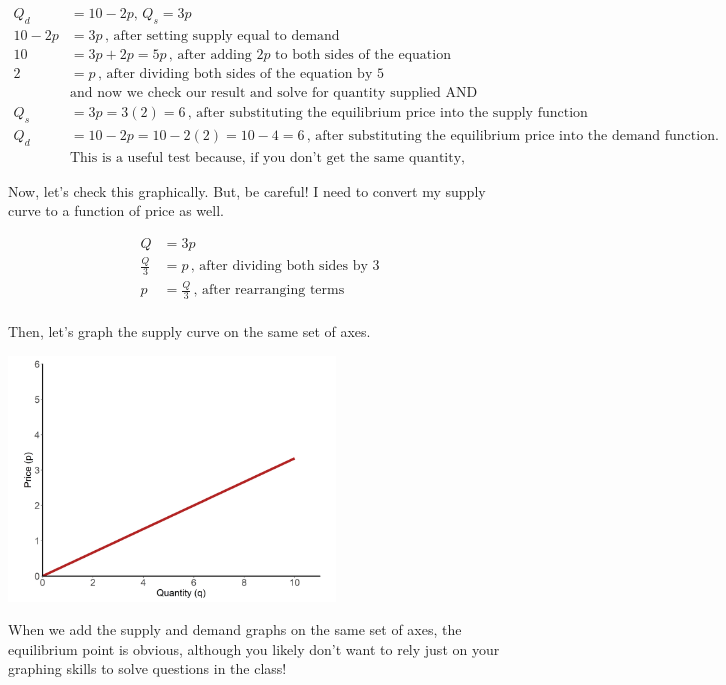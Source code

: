 \documentclass[11pt,]{article}
\begin{document}
\begin{align*}
  Q_d&=10-2p,\,Q_s=3p\\
  10-2p&=3p\,\text{, after setting supply equal to demand}\\
  10&=3p+2p=5p\,\text{, after adding $2p$ to both sides of the equation}\\
  2&=p\,\text{, after dividing both sides of the equation by 5}\\
  &\text{and now we check our result and solve for quantity supplied AND demanded:}\\
  Q_s&=3p=3(2)=6\,\text{, after substituting the equilibrium price into the supply function}\\
  Q_d&=10-2p=10-2(2)=10-4=6\,\text{, after substituting the equilibrium price into the demand function.}\\
  &\text{This is a useful test because, if you don't get the same quantity, you've done it incorrectly.}
\end{align*}

Now, let's check this graphically. But, be careful! I need to convert my
supply curve to a function of price as well.

\begin{align*}
  Q&=3p\\
  \frac{Q}{3}&=p\,\text{, after dividing both sides by 3}\\
  p&=\frac{Q}{3}\,\text{, after rearranging terms}\\
\end{align*}

Then, let's graph the supply curve on the same set of axes.

\begin{center}
\includegraphics[width=0.65\textwidth]{../images/eg_supply.png}
\end{center}

When we add the supply and demand graphs on the same set of axes, the
equilibrium point is obvious, although you likely don't want to rely
just on your graphing skills to solve questions in the class!
\end{document}
